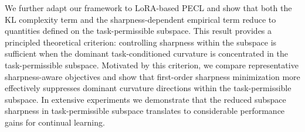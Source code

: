 \documentclass{article}
\theoremstyle{plain}
\theoremstyle{definition}
\theoremstyle{remark}
\newcommand{\JW}[1]{{\color{magenta}{\bf JW:} #1}}
\begin{document}
We further adapt our framework to LoRA-based PECL and show that both the KL complexity term and the sharpness-dependent empirical term reduce to quantities defined on the task-permissible subspace. This result provides a principled theoretical criterion: controlling sharpness within the subspace is sufficient when the dominant task-conditioned curvature is concentrated in the task-permissible subspace.
Motivated by this criterion, we compare representative sharpness-aware objectives and show that first-order sharpness minimization more effectively suppresses dominant curvature directions within the task-permissible subspace.
In extensive experiments we demonstrate that the reduced subspace sharpness in task-permissible subspace translates to considerable performance gains for continual learning.









\end{document}
